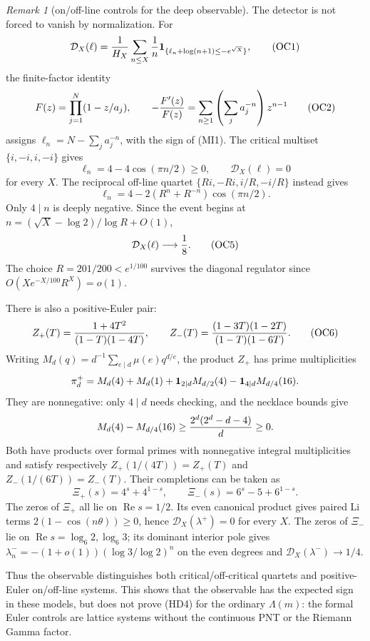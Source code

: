 \documentclass[11pt]{amsart}
\theoremstyle{definition}
\theoremstyle{remark}
\newtheorem{remark}[theorem]{Remark}
\theoremstyle{definition}
\renewcommand{\Re}{\operatorname{Re}}
\begin{document}
\begin{remark}[on/off-line controls for the deep observable]
\label{rmk:on-off-deep-controls}
The detector is not forced to vanish by normalization.  For
\[
 \mathcal D_X(\ell)={1\over H_X}\sum_{n\le X}{1\over n}
 {\bf1}_{\{\ell_n+\log(n+1)\le-e^{\sqrt X}\}},          \tag{OC1}
\]
the finite-factor identity
\[
 F(z)=\prod_{j=1}^{N}(1-z/a_j),\qquad
 -{F'(z)\over F(z)}
 =\sum_{n\ge1}\left(\sum_j a_j^{-n}\right)z^{n-1}       \tag{OC2}
\]
assigns $\ell_n=N-\sum_j a_j^{-n}$, with the sign of (MI1).
The critical multiset $\{i,-i,i,-i\}$ gives
\[
 \ell_n=4-4\cos(\pi n/2)\ge0,\qquad \mathcal D_X(\ell)=0
                                                               \tag{OC3}
\]
for every $X$.  The reciprocal off-line quartet
$\{Ri,-Ri,i/R,-i/R\}$ instead gives
\[
 \ell_n=4-2(R^n+R^{-n})\cos(\pi n/2).                  \tag{OC4}
\]
Only $4\mid n$ is deeply negative.  Since the event begins at
$n=(\sqrt X-\log2)/\log R+O(1)$,
\[
 \mathcal D_X(\ell)\longrightarrow {1\over8}.           \tag{OC5}
\]
The choice $R=201/200<e^{1/100}$ survives the diagonal regulator since
$O(Xe^{-X/100}R^X)=o(1)$.

There is also a positive-Euler pair:
\[
 Z_+(T)={1+4T^2\over(1-T)(1-4T)},\qquad
 Z_-(T)={(1-3T)(1-2T)\over(1-T)(1-6T)}.                \tag{OC6}
\]
Writing $M_d(q)=d^{-1}\sum_{e\mid d}\mu(e)q^{d/e}$, the product $Z_+$
has prime multiplicities
\[
 \pi_d^+=M_d(4)+M_d(1)+{\bf1}_{2\mid d}M_{d/2}(4)
                    -{\bf1}_{4\mid d}M_{d/4}(16).
\]
They are nonnegative: only $4\mid d$ needs checking, and the necklace
bounds give
\[
 M_d(4)-M_{d/4}(16)
 \ge {2^d(2^d-d-4)\over d}\ge0.
\]
Both have products over formal primes with nonnegative integral
multiplicities and satisfy respectively
$Z_+(1/(4T))=Z_+(T)$ and $Z_-(1/(6T))=Z_-(T)$.
Their completions can be taken as
\[
 \Xi_+(s)=4^s+4^{1-s},\qquad
 \Xi_-(s)=6^s-5+6^{1-s}.                               \tag{OC7}
\]
The zeros of $\Xi_+$ all lie on $\Re s=1/2$.  Its even canonical product
gives paired Li terms $2(1-\cos(n\theta))\ge0$, hence
$\mathcal D_X(\lambda^+)=0$ for every $X$.  The zeros of $\Xi_-$ lie on
$\Re s=\log_6 2,\log_6 3$; its dominant interior pole gives
$\lambda_n^-=-(1+o(1))(\log3/\log2)^n$ on the even degrees and
$\mathcal D_X(\lambda^-)\to1/4$.

Thus the observable distinguishes both critical/off-critical quartets
and positive-Euler on/off-line systems.  This shows that the observable
has the expected sign in these models, but does not prove (HD4) for the ordinary $\Lambda(m)$: the formal
Euler controls are lattice systems without the continuous PNT or the
Riemann Gamma factor.
\end{remark}
\end{document}
